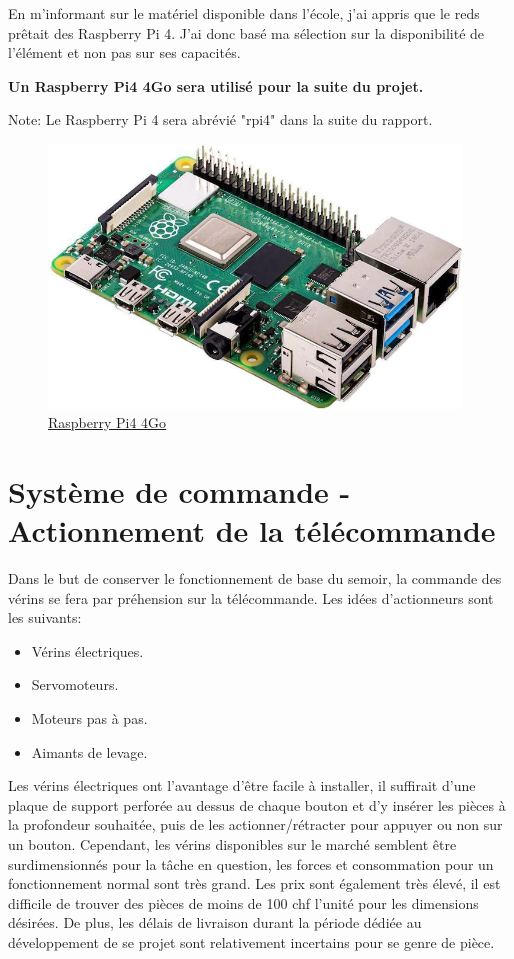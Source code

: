 En m'informant sur le matériel disponible dans l'école, j'ai appris que le \Gls{reds} prêtait des Raspberry Pi 4.
J'ai donc basé ma sélection sur la disponibilité de l'élément et non pas sur ses capacités.

\textbf{Un Raspberry Pi4 4Go sera utilisé pour la suite du projet.}

Note: Le Raspberry Pi 4 sera abrévié "\Gls{rpi4}" dans la suite du rapport.

\begin{figure}[H]
    \centering
    \includegraphics[height=7cm]{assets/figures/rpi4.png}
    \caption{\href{https://www.raspberrypi.com/}{Raspberry Pi4 4Go}}
\end{figure}

\newpage
\section{Système de commande - Actionnement de la télécommande}
Dans le but de conserver le fonctionnement de base du semoir, la commande des vérins se fera par préhension sur la télécommande.
Les idées d'actionneurs sont les suivants:
\begin{itemize}
    \item Vérins électriques.
    \item Servomoteurs.
    \item Moteurs pas à pas.
    \item Aimants de levage.
\end{itemize}

Les vérins électriques ont l'avantage d'être facile à installer, il suffirait d'une plaque de support perforée au dessus de chaque bouton et d'y insérer
les pièces à la profondeur souhaitée, puis de les actionner/rétracter pour appuyer ou non sur un bouton. Cependant, les vérins disponibles sur le marché semblent être surdimensionnés pour la tâche en question, les forces et
consommation pour un fonctionnement normal sont très grand. Les prix sont également très élevé, il est difficile de trouver des pièces de moins de 100 \Gls{chf} l'unité
pour les dimensions désirées. De plus, les délais de livraison durant la période dédiée au développement de se projet sont relativement incertains pour se genre de pièce.

